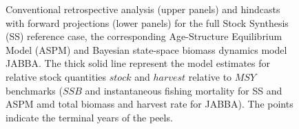 \documentclass[12pt,halfline,a4paper,nonumbib]{ouparticle}
\begin{document}
\begin{figure}


\caption{Conventional retrospective analysis (upper panels) and hindcasts with forward projections (lower panels) for the full Stock Synthesis (SS) reference case, the corresponding Age-Structure Equilibrium Model (ASPM) and Bayesian state-space biomass dynamics model JABBA.  The thick solid line represent the model estimates for relative stock quantities $stock$ and $harvest$ relative to $MSY$ benchmarks ($SSB$ and instantaneous fishing mortality for SS and ASPM amd total biomass and harvest rate for JABBA). The points indicate the terminal years of the peels.}\label{fig:retro}
\end{figure}
\end{document}

